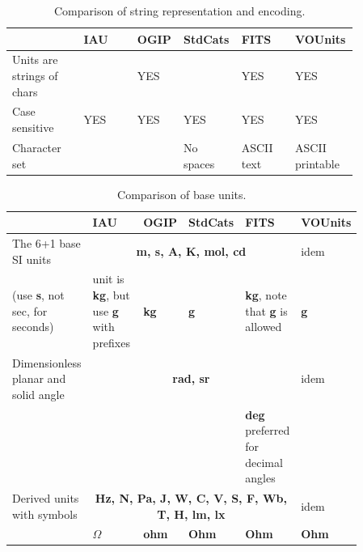 \documentclass[11pt,notitlepage,onecolumn]{ivoa}
\newcommand{\unit}[1]{\textbf{\textsf{\color{orange}#1}}}
\begin{document}
\begin{table}[ht]
  \begin{tabular}{|p{0.2\linewidth}|p{0.15\linewidth}|p{0.1\linewidth}|p{0.1\linewidth}|p{0.15\linewidth}|p{0.15\linewidth}|}
\hline
    & IAU & OGIP  & StdCats & FITS  & VOUnits\\\hline
    Units are strings of chars &  & YES &  & YES & YES\\\hline
    Case sensitive & YES & YES & YES & YES & YES\\\hline
    Character set &  &  & No spaces & ASCII text & ASCII printable\\\hline
\end{tabular}
  \caption{Comparison of string representation and encoding.}
  \label{tabx:comparUnitEncoding}
\end{table}


\begin{table}[ht]
\begin{tabular}{|p{0.2\linewidth}|p{0.15\linewidth}|p{0.12\linewidth}|p{0.12\linewidth}|p{0.12\linewidth}|p{0.15\linewidth}|}
\hline
    & IAU & OGIP  & StdCats & FITS  & VOUnits\\\hline
    The 6+1 base SI units\raggedright & \multicolumn{4}{c|}{\unit{m, s, A, K, mol, cd}} & idem \\
    \cline{2-6}
    (use \unit{s}, not sec, for seconds)\raggedright & unit is \unit{kg}, but use \unit{g} with prefixes\raggedright & \unit{kg} & \unit{g} & \unit{kg}, note that \unit{g} is allowed & \unit{g}\\
     \hline
    Dimensionless planar and solid angle\raggedright & \multicolumn{4}{c|}{\unit{rad, sr}} & idem \\
    \cline{2-5}
    &  &  &  & \unit{deg} preferred for decimal angles & \\\hline
    Derived units with symbols\raggedright & \multicolumn{4}{c|}{\unit{Hz, N, Pa,
      J, W, C, V, S, F, Wb, T, H, lm, lx}} & idem \\
     & \unit{$\Omega$} & \unit{ohm} & \unit{Ohm} & \unit{Ohm} & \unit{Ohm}\\\hline
\end{tabular}
  \caption{Comparison of base units.}
  \label{tabx:comparUnitBase}
\end{table}
\end{document}
